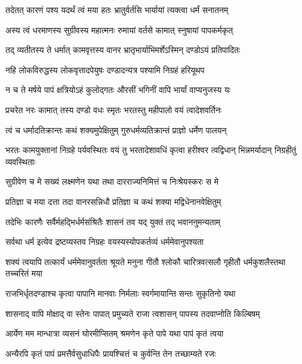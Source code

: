 \twolineshloka
{तदेतत् कारणं पश्य यदर्थं त्वं मया हतः}
{भ्रातुर्वर्तसि भार्यायां त्यक्त्वा धर्मं सनातनम्} %

\twolineshloka
{अस्य त्वं धरमाणस्य सुग्रीवस्य महात्मनः}
{रुमायां वर्तसे कामात् स्नुषायां पापकर्मकृत्} %

\twolineshloka
{तद् व्यतीतस्य ते धर्मात् कामवृत्तस्य वानर}
{भ्रातृभार्याभिमर्शेऽस्मिन् दण्डोऽयं प्रतिपादितः} %

\twolineshloka
{नहि लोकविरुद्धस्य लोकवृत्तादपेयुषः}
{दण्डादन्यत्र पश्यामि निग्रहं हरियूथप} %

\twolineshloka
{न च ते मर्षये पापं क्षत्रियोऽहं कुलोद्गतः}
{औरसीं भगिनीं वापि भार्यां वाप्यनुजस्य यः} %

\twolineshloka
{प्रचरेत नरः कामात् तस्य दण्डो वधः स्मृतः}
{भरतस्तु महीपालो वयं त्वादेशवर्तिनः} %

\twolineshloka
{त्वं च धर्मादतिक्रान्तः कथं शक्यमुपेक्षितुम्}
{गुरुधर्मव्यतिक्रान्तं प्राज्ञो धर्मेण पालयन्} %

\threelineshloka
{भरतः कामयुक्तानां निग्रहे पर्यवस्थितः}
{वयं तु भरतादेशावधिं कृत्वा हरीश्वर}
{त्वद्विधान् भिन्नमर्यादान् निग्रहीतुं व्यवस्थिताः} %

\twolineshloka
{सुग्रीवेण च मे सख्यं लक्ष्मणेन यथा तथा}
{दारराज्यनिमित्तं च निःश्रेयस्करः स मे} %

\twolineshloka
{प्रतिज्ञा च मया दत्ता तदा वानरसन्निधौ}
{प्रतिज्ञा च कथं शक्या मद्विधेनानवेक्षितुम्} %

\twolineshloka
{तदेभिः कारणैः सर्वैर्महद्भिर्धर्मसंश्रितैः}
{शासनं तव यद् युक्तं तद् भवाननुमन्यताम्} %

\twolineshloka
{सर्वथा धर्म इत्येव द्रष्टव्यस्तव निग्रहः}
{वयस्यस्योपकर्तव्यं धर्ममेवानुपश्यता} %

\threelineshloka
{शक्यं त्वयापि तत्कार्यं धर्ममेवानुवर्तता}
{श्रूयते मनुना गीतौ श्लोकौ चारित्रवत्सलौ}
{गृहीतौ धर्मकुशलैस्तथा तच्चरितं मया} %

\twolineshloka
{राजभिर्धृतदण्डाश्च कृत्वा पापानि मानवाः}
{निर्मलाः स्वर्गमायान्ति सन्तः सुकृतिनो यथा} %

\twolineshloka
{शासनाद् वापि मोक्षाद् वा स्तेनः पापात् प्रमुच्यते}
{राजा त्वशासन् पापस्य तदवाप्नोति किल्बिषम्} %

\twolineshloka
{आर्येण मम मान्धात्रा व्यसनं घोरमीप्सितम्}
{श्रमणेन कृते पापे यथा पापं कृतं त्वया} %

\twolineshloka
{अन्यैरपि कृतं पापं प्रमत्तैर्वसुधाधिपैः}
{प्रायश्चित्तं च कुर्वन्ति तेन तच्छाम्यते रजः} %

